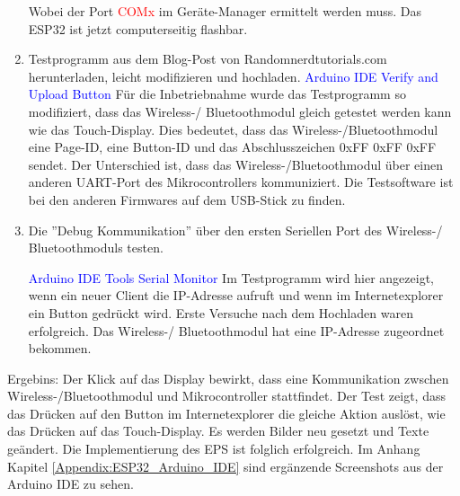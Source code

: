 \begin{enumerate}
Wobei der Port \textcolor{red}{COMx} im Geräte-Manager ermittelt werden muss. Das ESP32 ist jetzt computerseitig flashbar.

\item Testprogramm aus dem Blog-Post von Randomnerdtutorials.com herunterladen, leicht modifizieren und hochladen. \cite{santos_esp32_2018}\newline
\textcolor{blue}{Arduino IDE \textrightarrow Verify and Upload Button} \newline
Für die Inbetriebnahme wurde das Testprogramm so modifiziert, dass das Wireless-/ Bluetoothmodul gleich getestet werden kann wie das Touch-Display. Dies bedeutet, dass das Wireless-/Bluetoothmodul eine Page-ID, eine Button-ID und das Abschlusszeichen 0xFF 0xFF 0xFF sendet. Der Unterschied ist, dass das Wireless-/Bluetoothmodul über einen anderen UART-Port des Mikrocontrollers kommuniziert. Die Testsoftware ist bei den anderen Firmwares auf dem USB-Stick zu finden.\newline

\item Die ''Debug Kommunikation'' über den ersten Seriellen Port des Wireless-/ Bluetoothmoduls testen.

\textcolor{blue}{Arduino IDE \textrightarrow Tools \textrightarrow Serial Monitor}\newline
Im Testprogramm wird hier angezeigt, wenn ein neuer Client die IP-Adresse aufruft und wenn im Internetexplorer ein Button gedrückt wird. Erste Versuche nach dem Hochladen waren erfolgreich. Das Wireless-/ Bluetoothmodul hat eine IP-Adresse zugeordnet bekommen.
\end{enumerate}

Ergebins: Der Klick auf das Display bewirkt, dass eine Kommunikation zwschen Wireless-/Bluetoothmodul und Mikrocontroller stattfindet. Der Test zeigt, dass das Drücken auf den Button im Internetexplorer die gleiche Aktion auslöst, wie das Drücken auf das Touch-Display. Es werden Bilder neu gesetzt und Texte geändert. Die Implementierung des EPS ist folglich erfolgreich. Im Anhang Kapitel \ref{Appendix:ESP32_Arduino_IDE} sind ergänzende Screenshots aus der Arduino IDE zu sehen.
